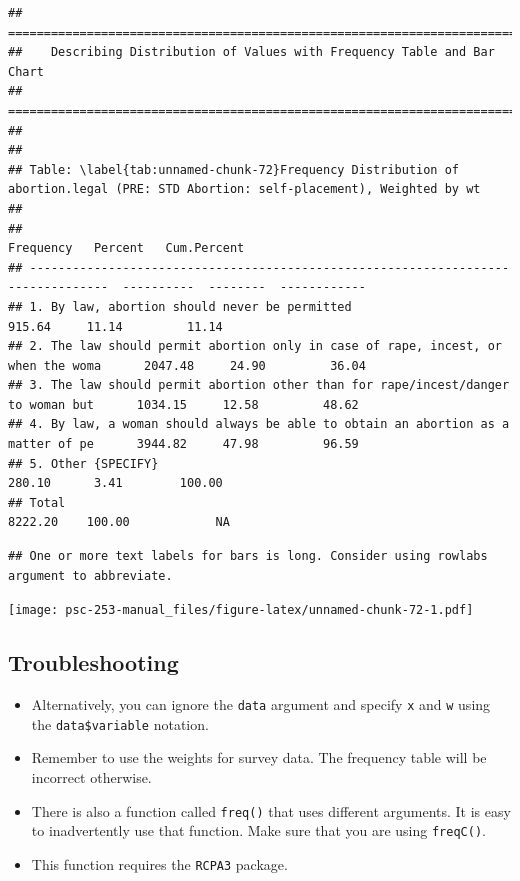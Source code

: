 \documentclass[
]{book}
\providecommand{\tightlist}{%
  \setlength{\itemsep}{0pt}\setlength{\parskip}{0pt}}
\begin{document}
\begin{verbatim}
## ===========================================================================
##    Describing Distribution of Values with Frequency Table and Bar Chart
## ===========================================================================
## 
## 
## Table: \label{tab:unnamed-chunk-72}Frequency Distribution of abortion.legal (PRE: STD Abortion: self-placement), Weighted by wt
## 
##                                                                                     Frequency   Percent   Cum.Percent
## ---------------------------------------------------------------------------------  ----------  --------  ------------
## 1. By law, abortion should never be permitted                                          915.64     11.14         11.14
## 2. The law should permit abortion only in case of rape, incest, or when the woma      2047.48     24.90         36.04
## 3. The law should permit abortion other than for rape/incest/danger to woman but      1034.15     12.58         48.62
## 4. By law, a woman should always be able to obtain an abortion as a matter of pe      3944.82     47.98         96.59
## 5. Other {SPECIFY}                                                                     280.10      3.41        100.00
## Total                                                                                 8222.20    100.00            NA
\end{verbatim}

\begin{verbatim}
## One or more text labels for bars is long. Consider using rowlabs argument to abbreviate.
\end{verbatim}

\texttt{[image: psc-253-manual\_files/figure-latex/unnamed-chunk-72-1.pdf]}

\hypertarget{troubleshooting-26}{%
\subsection{Troubleshooting}\label{troubleshooting-26}}

\begin{itemize}
\tightlist
\item
  Alternatively, you can ignore the \texttt{data} argument and specify \texttt{x} and \texttt{w} using the \texttt{data\$variable} notation.
\item
  Remember to use the weights for survey data. The frequency table will be incorrect otherwise.
\item
  There is also a function called \texttt{freq()} that uses different arguments. It is easy to inadvertently use that function. Make sure that you are using \texttt{freqC()}.
\item
  This function requires the \texttt{RCPA3} package.
\end{itemize}
\end{document}
